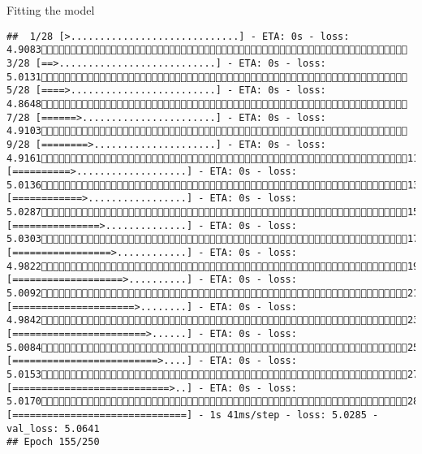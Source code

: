 \documentclass[
  ignorenonframetext,
]{beamer}
\begin{document}
\begin{frame}[fragile]{Fitting the model}
\begin{verbatim}
##  1/28 [>.............................] - ETA: 0s - loss: 4.9083 3/28 [==>...........................] - ETA: 0s - loss: 5.0131 5/28 [====>.........................] - ETA: 0s - loss: 4.8648 7/28 [======>.......................] - ETA: 0s - loss: 4.9103 9/28 [========>.....................] - ETA: 0s - loss: 4.916111/28 [==========>...................] - ETA: 0s - loss: 5.013613/28 [============>.................] - ETA: 0s - loss: 5.028715/28 [===============>..............] - ETA: 0s - loss: 5.030317/28 [=================>............] - ETA: 0s - loss: 4.982219/28 [===================>..........] - ETA: 0s - loss: 5.009221/28 [=====================>........] - ETA: 0s - loss: 4.984223/28 [=======================>......] - ETA: 0s - loss: 5.008425/28 [=========================>....] - ETA: 0s - loss: 5.015327/28 [===========================>..] - ETA: 0s - loss: 5.017028/28 [==============================] - 1s 41ms/step - loss: 5.0285 - val_loss: 5.0641
## Epoch 155/250

\end{verbatim}
\end{frame}
\end{document}
